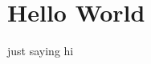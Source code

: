 \documentclass{article}
\begin{document}
\section{Hello World}%
\label{sec:hello_world}

just saying hi

	
\end{document}
